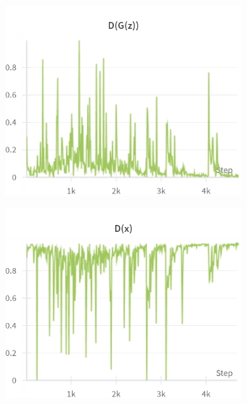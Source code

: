 \begin{figure}[H]
    \begin{subfigure}{0.45\textwidth}
        \centering
        \includegraphics[width=0.95\linewidth]{ngf/8/D_G_z.png}
        \caption{}
        \label{subfig:ngf/8/D_G_z}
    \end{subfigure}%
    \begin{subfigure}{0.45\textwidth}
        \centering
        \includegraphics[width=0.95\linewidth]{ngf/8/D_x.png}
        \caption{}
        \label{subfig:ngf/8/D_x}
    \end{subfigure}


\end{figure}
